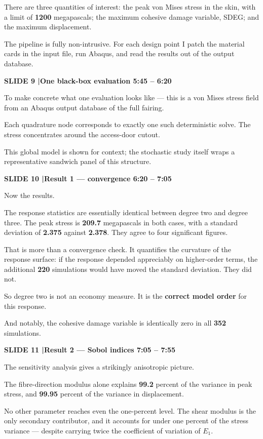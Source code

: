 \documentclass[12pt,a4paper]{article}
\newcommand{\slide}[3]{%
  \bigskip
  \noindent\colorbox{luhblue}{\parbox{\dimexpr\linewidth-2\fboxsep}{%
    \color{white}\bfseries\small SLIDE #1 \quad|\quad #2 \hfill #3}}\par
  \nopagebreak\vspace{0.3em}}
\newcommand{\num}[1]{\textbf{#1}}
\begin{document}
There are three quantities of interest: the peak von Mises stress in the skin, with a
limit of \num{1200} megapascals; the maximum cohesive damage variable, SDEG; and
the maximum displacement.

The pipeline is fully non-intrusive. For each design point I patch the material cards in
the input file, run Abaqus, and read the results out of the output database.

\slide{9}{One black-box evaluation}{5:45 -- 6:20}

To make concrete what one evaluation looks like --- this is a von Mises stress field
from an Abaqus output database of the full fairing.

Each quadrature node corresponds to exactly one such deterministic solve. The stress
concentrates around the access-door cutout.

This global model is shown for context; the stochastic study itself wraps a
representative sandwich panel of this structure.

\slide{10}{Result 1 --- convergence}{6:20 -- 7:05}
Now the results.

The response statistics are essentially identical between degree two and degree three.
The peak stress is \num{209.7} megapascals in both cases, with a standard deviation
of \num{2.375} against \num{2.378}. They agree to four significant figures.

That is more than a convergence check. It quantifies the curvature of the response
surface: if the response depended appreciably on higher-order terms, the additional
\num{220} simulations would have moved the standard deviation. They did not.

So degree two is not an economy measure. It is the \textbf{correct model order} for this
response.

And notably, the cohesive damage variable is identically zero in all
\num{352} simulations.

\slide{11}{Result 2 --- Sobol indices}{7:05 -- 7:55}

The sensitivity analysis gives a strikingly anisotropic picture.

The fibre-direction modulus alone explains \num{99.2} percent of the variance in
peak stress, and \num{99.95} percent of the variance in displacement.

No other parameter reaches even the one-percent level. The shear modulus is the only
secondary contributor, and it accounts for under one percent of the stress variance ---
despite carrying twice the coefficient of variation of $E_1$.
\end{document}

